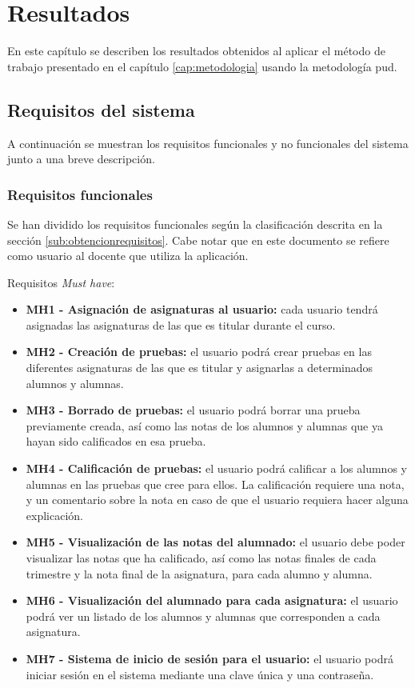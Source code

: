 \chapter{Resultados}
\label{cap:resultados}
En este capítulo se describen los resultados obtenidos al aplicar el método de trabajo presentado en el capítulo \ref{cap:metodologia} usando la metodología \gls{pud}.

\section{Requisitos del sistema}
A continuación se muestran los requisitos funcionales y no funcionales del sistema junto a una breve descripción.

\subsection{Requisitos funcionales}
Se han dividido los requisitos funcionales según la clasificación descrita en la sección \ref{sub:obtencionrequisitos}. Cabe notar que en este documento se refiere como usuario al docente que utiliza la aplicación.

Requisitos \textit{Must have}:
\begin{itemize}
	\item \textbf{MH1 - Asignación de asignaturas al usuario:} cada usuario tendrá asignadas las asignaturas de las que es titular durante el curso. 
	\item \textbf{MH2 - Creación de pruebas:} el usuario podrá crear pruebas en las diferentes asignaturas de las que es titular y asignarlas a determinados alumnos y alumnas.
	\item \textbf{MH3 - Borrado de pruebas:} el usuario podrá borrar una prueba previamente creada, así como las notas de los alumnos y alumnas que ya hayan sido calificados en esa prueba.
	\item \textbf{MH4 - Calificación de pruebas:} el usuario podrá calificar a los alumnos y alumnas en las pruebas que cree para ellos. La calificación requiere una nota, y un comentario sobre la nota en caso de que el usuario requiera hacer alguna explicación.
	\item \textbf{MH5 - Visualización de las notas del alumnado:} el usuario debe poder visualizar las notas que ha calificado, así como las notas finales de cada trimestre y la nota final de la asignatura, para cada alumno y alumna.
	\item \textbf{MH6 - Visualización del alumnado para cada asignatura:} el usuario podrá ver un listado de los alumnos y alumnas que corresponden a cada asignatura.
	\item \textbf{MH7 - Sistema de inicio de sesión para el usuario:} el usuario podrá iniciar sesión en el sistema mediante una clave única y una contraseña.
\end{itemize}
	
